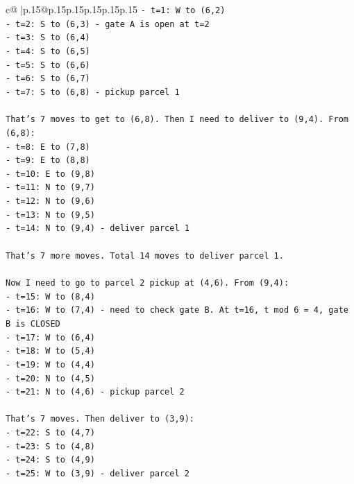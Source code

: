 \documentclass{article}
\begin{document}
{\begin{supertabular}{c@{$\;$}|p{.15\linewidth}@{}p{.15\linewidth}p{.15\linewidth}p{.15\linewidth}p{.15\linewidth}p{.15\linewidth}}
{{{\texttt{{-} t=1: W to (6,2)} \\
\texttt{{-} t=2: S to (6,3) {-} gate A is open at t=2} \\
\texttt{{-} t=3: S to (6,4)} \\
\texttt{{-} t=4: S to (6,5)} \\
\texttt{{-} t=5: S to (6,6)} \\
\texttt{{-} t=6: S to (6,7)} \\
\texttt{{-} t=7: S to (6,8) {-} pickup parcel 1} \\
\\ 
\texttt{That's 7 moves to get to (6,8). Then I need to deliver to (9,4). From (6,8):} \\
\texttt{{-} t=8: E to (7,8)} \\
\texttt{{-} t=9: E to (8,8)} \\
\texttt{{-} t=10: E to (9,8)} \\
\texttt{{-} t=11: N to (9,7)} \\
\texttt{{-} t=12: N to (9,6)} \\
\texttt{{-} t=13: N to (9,5)} \\
\texttt{{-} t=14: N to (9,4) {-} deliver parcel 1} \\
\\ 
\texttt{That's 7 more moves. Total 14 moves to deliver parcel 1.} \\
\\ 
\texttt{Now I need to go to parcel 2 pickup at (4,6). From (9,4):} \\
\texttt{{-} t=15: W to (8,4)} \\
\texttt{{-} t=16: W to (7,4) {-} need to check gate B. At t=16, t mod 6 = 4, gate B is CLOSED} \\
\texttt{{-} t=17: W to (6,4)} \\
\texttt{{-} t=18: W to (5,4)} \\
\texttt{{-} t=19: W to (4,4)} \\
\texttt{{-} t=20: N to (4,5)} \\
\texttt{{-} t=21: N to (4,6) {-} pickup parcel 2} \\
\\ 
\texttt{That's 7 moves. Then deliver to (3,9):} \\
\texttt{{-} t=22: S to (4,7)} \\
\texttt{{-} t=23: S to (4,8)} \\
\texttt{{-} t=24: S to (4,9)} \\
\texttt{{-} t=25: W to (3,9) {-} deliver parcel 2} \\
}}}
\end{supertabular}}
\end{document}
